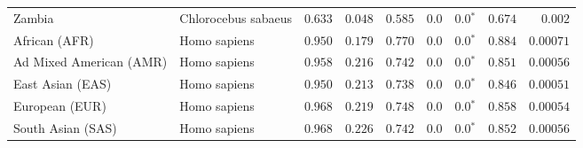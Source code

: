 \begin{center}
\begin{adjustbox}{width = 1\textwidth}
\begin{tabular}{|l|l|r|r|r|r|r|r|r|}
            Zambia        & Chlorocebus sabaeus        & $ 0.633$ & $ 0.048$ & $ 0.585$ & $0.0$    & $\bm{0.0{^*}}$ & $ 0.674$ & $ 0.002$ \\
            African (AFR)               & Homo sapiens        & $ 0.950$ & $ 0.179$ & $ 0.770$ & $0.0$    & $\bm{0.0{^*}}$ & $ 0.884$ & $0.00071$ \\
            Ad Mixed American (AMR)                 & Homo sapiens        & $ 0.958$ & $ 0.216$ & $ 0.742$ & $0.0$    & $\bm{0.0{^*}}$ & $ 0.851$ & $0.00056$ \\
            East Asian (EAS)              & Homo sapiens        & $ 0.950$ & $ 0.213$ & $ 0.738$ & $0.0$    & $\bm{0.0{^*}}$ & $ 0.846$ & $0.00051$ \\
            European (EUR)              & Homo sapiens        & $ 0.968$ & $ 0.219$ & $ 0.748$ & $0.0$    & $\bm{0.0{^*}}$ & $ 0.858$ & $0.00054$ \\
            South Asian (SAS)              & Homo sapiens        & $ 0.968$ & $ 0.226$ & $ 0.742$ & $0.0$    & $\bm{0.0{^*}}$ & $ 0.852$ & $0.00056$ \\
            \bottomrule
        \end{tabular}
    \end{adjustbox}
\end{center}
